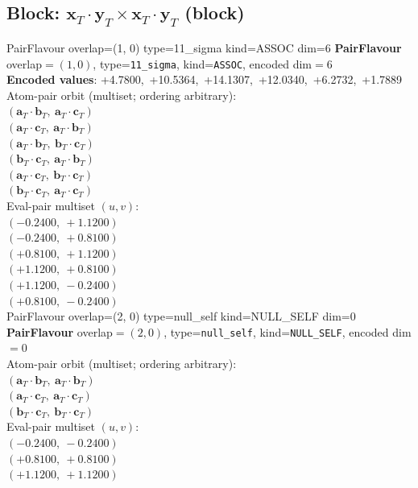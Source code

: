 \documentclass[a4paper,11pt]{article}
\newcommand{\fpbeomcfokjooi}[2]{\mathbf{#1}_T \cdot \mathbf{#2}_T}
\begin{document}
\subsection{Block: $\fpbeomcfokjooi{x}{y} \times \fpbeomcfokjooi{x}{y}$  (block)}
    PairFlavour  overlap=(1, 0)  type=11\_sigma  kind=ASSOC  dim=6
\textbf{PairFlavour} overlap$=(1, 0)$, type=\texttt{11\_sigma}, kind=\texttt{ASSOC}, encoded dim$=6$\\
\textbf{      Encoded values}: +4.7800,\ +10.5364,\ +14.1307,\ +12.0340,\ +6.2732,\ +1.7889\\
\quad Atom-pair orbit (multiset; ordering arbitrary):\\
$(\fpbeomcfokjooi{a}{b},\ \fpbeomcfokjooi{a}{c})$\\
$(\fpbeomcfokjooi{a}{c},\ \fpbeomcfokjooi{a}{b})$\\
$(\fpbeomcfokjooi{a}{b},\ \fpbeomcfokjooi{b}{c})$\\
$(\fpbeomcfokjooi{b}{c},\ \fpbeomcfokjooi{a}{b})$\\
$(\fpbeomcfokjooi{a}{c},\ \fpbeomcfokjooi{b}{c})$\\
$(\fpbeomcfokjooi{b}{c},\ \fpbeomcfokjooi{a}{c})$\\
\quad Eval-pair multiset $(u, v)$:\\
$(-0.2400,\ +1.1200)$\\
$(-0.2400,\ +0.8100)$\\
$(+0.8100,\ +1.1200)$\\
$(+1.1200,\ +0.8100)$\\
$(+1.1200,\ -0.2400)$\\
$(+0.8100,\ -0.2400)$\\
    PairFlavour  overlap=(2, 0)  type=null\_self  kind=NULL\_SELF  dim=0
\textbf{PairFlavour} overlap$=(2, 0)$, type=\texttt{null\_self}, kind=\texttt{NULL\_SELF}, encoded dim$=0$\\
\quad Atom-pair orbit (multiset; ordering arbitrary):\\
$(\fpbeomcfokjooi{a}{b},\ \fpbeomcfokjooi{a}{b})$\\
$(\fpbeomcfokjooi{a}{c},\ \fpbeomcfokjooi{a}{c})$\\
$(\fpbeomcfokjooi{b}{c},\ \fpbeomcfokjooi{b}{c})$\\
\quad Eval-pair multiset $(u, v)$:\\
$(-0.2400,\ -0.2400)$\\
$(+0.8100,\ +0.8100)$\\
$(+1.1200,\ +1.1200)$\\
\end{document}
